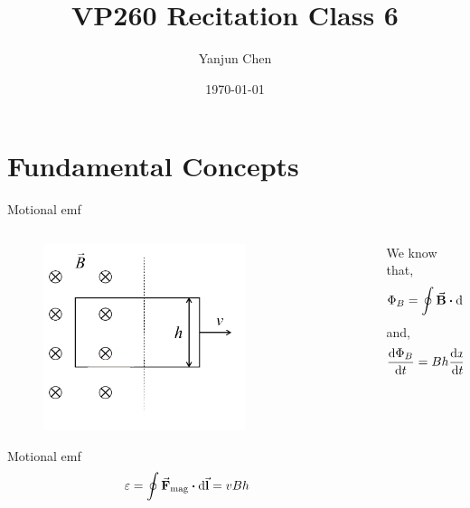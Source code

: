 \documentclass{beamer}
\title[VP260 RC]{VP260 Recitation Class 6} %
\author{Yanjun Chen} %
\institute[UM-SJTU JI] %
{
    University of Michigan - Shanghai Jiao Tong University Joint Institute\\%
\medskip
}
\date{\today} %
\begin{document}
\begin{frame}
    \titlepage %
\end{frame}



\section{Fundamental Concepts} %

\begin{frame}{Motional emf}
    \begin{columns}
        \begin{column}{0.5\textwidth}
            \begin{figure}[htbp]
                \centering
                \includegraphics[width=0.7\textwidth]{Images/motional.jpg}
            \end{figure}

            \begin{block}{Motional emf}
                \begin{equation}
                    \varepsilon = \oint \va{F}_{\text{mag}} \vdot \dd{\va{l}} =  v B h
                \end{equation}
            \end{block}
        \end{column}
        \begin{column}{0.5\textwidth}
            We know that,
            \begin{equation}
                \Phi_B = \oint \va{B} \vdot \dd{\va{l}} = Bxh
            \end{equation}
            and,
            \begin{equation}
                \dv{\Phi_B}{t} = Bh\dv{x}{t} = -Bhv = -\varepsilon
            \end{equation}


\end{column}
\end{columns}
\end{frame}
\end{document}
